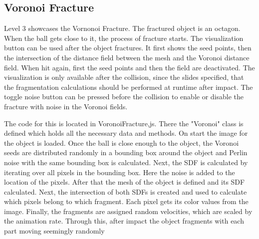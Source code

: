 \documentclass{article}
\begin{document}
\subsection{Voronoi Fracture}
Level 3 showcases the Vornonoi Fracture. The fractured object is an octagon. When the ball gets close to it, the process of fracture starts. The visualization button can be used after the object fractures. It first shows the seed points, then the intersection of the distance field between the mesh and the Voronoi distance field. When hit again, first the seed points and then the field are deactivated. The visualization is only available after the collision, since the slides specified, that the fragmentation calculations should be performed at runtime after impact. The toggle noise button can be pressed before the collision to enable or disable the fracture with noise in the Voronoi fields.

The code for this is located in VoronoiFracture,js. There the "Voronoi" class is defined which holds all the necessary data and methods. On start the image for the object is loaded. Once the ball is close enough to the object, the Voronoi seeds are distributed randomly in a bounding box around the object and Perlin noise with the same bounding box is calculated. Next, the SDF is calculated by iterating over all pixels in the bounding box. Here the noise is added to the location of the pixels. After that the mesh of the object is defined and its SDF calculated. Next, the intersection of both SDFs is created and used to calculate which pixels belong to which fragment. Each pixel gets its color values from the image. Finally, the fragments are assigned random velocities, which are scaled by the animation rate. Through this, after impact the object fragments with each part moving seemingly randomly
\end{document}

